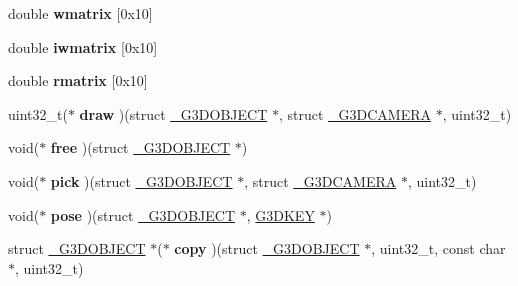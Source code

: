 \begin{DoxyCompactItemize}
\item 
\mbox{\label{struct__G3DOBJECT_aa9dde10e75aabb1efd49c57b7cd46de1}} 
double {\bfseries wmatrix} \mbox{[}0x10\mbox{]}
\item 
\mbox{\label{struct__G3DOBJECT_a1a5bd98a69648a3b9cf35db929354495}} 
double {\bfseries iwmatrix} \mbox{[}0x10\mbox{]}
\item 
\mbox{\label{struct__G3DOBJECT_a8255371167bfc1d88893f8dbb329b83c}} 
double {\bfseries rmatrix} \mbox{[}0x10\mbox{]}
\item 
\mbox{\label{struct__G3DOBJECT_af8cc258a43c32945854e6428d9d1144f}} 
uint32\+\_\+t($\ast$ {\bfseries draw} )(struct \hyperlink{struct__G3DOBJECT}{\+\_\+\+G3\+D\+O\+B\+J\+E\+CT} $\ast$, struct \hyperlink{struct__G3DCAMERA}{\+\_\+\+G3\+D\+C\+A\+M\+E\+RA} $\ast$, uint32\+\_\+t)
\item 
\mbox{\label{struct__G3DOBJECT_a34a950035675de0bf5b90073e2c06641}} 
void($\ast$ {\bfseries free} )(struct \hyperlink{struct__G3DOBJECT}{\+\_\+\+G3\+D\+O\+B\+J\+E\+CT} $\ast$)
\item 
\mbox{\label{struct__G3DOBJECT_a1a40c7eebb6cc21a02a1f646b7f4fcb1}} 
void($\ast$ {\bfseries pick} )(struct \hyperlink{struct__G3DOBJECT}{\+\_\+\+G3\+D\+O\+B\+J\+E\+CT} $\ast$, struct \hyperlink{struct__G3DCAMERA}{\+\_\+\+G3\+D\+C\+A\+M\+E\+RA} $\ast$, uint32\+\_\+t)
\item 
\mbox{\label{struct__G3DOBJECT_a5c9bf07fb383cbcea41ffee521523e51}} 
void($\ast$ {\bfseries pose} )(struct \hyperlink{struct__G3DOBJECT}{\+\_\+\+G3\+D\+O\+B\+J\+E\+CT} $\ast$, \hyperlink{struct__G3DKEY}{G3\+D\+K\+EY} $\ast$)
\item 
\mbox{\label{struct__G3DOBJECT_a5604450664884453ddfc2b92f6cf3902}} 
struct \hyperlink{struct__G3DOBJECT}{\+\_\+\+G3\+D\+O\+B\+J\+E\+CT} $\ast$($\ast$ {\bfseries copy} )(struct \hyperlink{struct__G3DOBJECT}{\+\_\+\+G3\+D\+O\+B\+J\+E\+CT} $\ast$, uint32\+\_\+t, const char $\ast$, uint32\+\_\+t)
\item 
\mbox{\label{struct__G3DOBJECT_ad91bb91159d937d658be0e98569bb7e8}} 

\end{DoxyCompactItemize}
